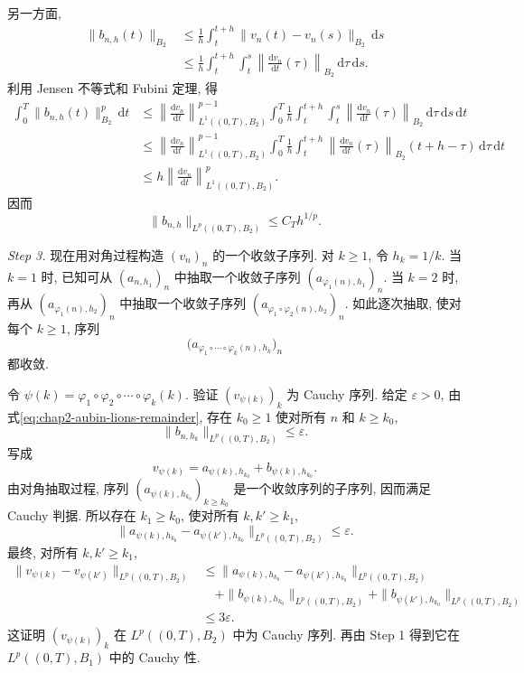 \begin{Proof}
另一方面,
\begin{align*}
 \|b_{n,h}(t)\|_{B_2}
 &\leq\frac1h\int_t^{t+h}\|v_n(t)-v_n(s)\|_{B_2}\,\mathrm{d}s\\
 &\leq\frac1h\int_t^{t+h}\int_t^s
 \left\|\frac{\mathrm{d}v_n}{\mathrm{d}t}(\tau)\right\|_{B_2}
 \,\mathrm{d}\tau\,\mathrm{d}s.
\end{align*}
利用 Jensen 不等式和 Fubini 定理, 得
\begin{align*}
 \int_0^T\|b_{n,h}(t)\|_{B_2}^p\,\mathrm{d}t
 &\leq
 \left\|\frac{\mathrm{d}v_n}{\mathrm{d}t}\right\|_{L^1((0,T),B_2)}^{p-1}
 \int_0^T\frac1h\int_t^{t+h}\int_t^s
 \left\|\frac{\mathrm{d}v_n}{\mathrm{d}t}(\tau)\right\|_{B_2}
 \,\mathrm{d}\tau\,\mathrm{d}s\,\mathrm{d}t\\
 &\leq
 \left\|\frac{\mathrm{d}v_n}{\mathrm{d}t}\right\|_{L^1((0,T),B_2)}^{p-1}
 \int_0^T\frac1h\int_t^{t+h}
 \left\|\frac{\mathrm{d}v_n}{\mathrm{d}t}(\tau)\right\|_{B_2}
 (t+h-\tau)\,\mathrm{d}\tau\,\mathrm{d}t\\
 &\leq h
 \left\|\frac{\mathrm{d}v_n}{\mathrm{d}t}\right\|_{L^1((0,T),B_2)}^p.
\end{align*}
因而
\begin{equation}
 \|b_{n,h}\|_{L^p((0,T),B_2)}\leq C_T h^{1/p}.
 \label{eq:chap2-aubin-lions-remainder}
\end{equation}

\emph{Step 3.} 现在用对角过程构造 $(v_n)_n$ 的一个收敛子序列. 对 $k\geq1$, 令 $h_k=1/k$. 当 $k=1$ 时, 已知可从 $(a_{n,h_1})_n$ 中抽取一个收敛子序列 $(a_{\varphi_1(n),h_1})_n$. 当 $k=2$ 时, 再从 $(a_{\varphi_1(n),h_2})_n$ 中抽取一个收敛子序列 $(a_{\varphi_1\circ\varphi_2(n),h_2})_n$. 如此逐次抽取, 使对每个 $k\geq1$, 序列
\[
 \bigl(a_{\varphi_1\circ\cdots\circ\varphi_k(n),h_k}\bigr)_n
\]
都收敛.

令 $\psi(k)=\varphi_1\circ\varphi_2\circ\cdots\circ\varphi_k(k)$. 验证 $(v_{\psi(k)})_k$ 为 Cauchy 序列. 给定 $\varepsilon>0$, 由式\eqref{eq:chap2-aubin-lions-remainder}, 存在 $k_0\geq1$ 使对所有 $n$ 和 $k\geq k_0$,
\[
 \|b_{n,h_k}\|_{L^p((0,T),B_2)}\leq\varepsilon.
\]
写成
\[
 v_{\psi(k)}=a_{\psi(k),h_{k_0}}+b_{\psi(k),h_{k_0}}.
\]
由对角抽取过程, 序列 $(a_{\psi(k),h_{k_0}})_{k\geq k_0}$ 是一个收敛序列的子序列, 因而满足 Cauchy 判据. 所以存在 $k_1\geq k_0$, 使对所有 $k,k'\geq k_1$,
\[
 \|a_{\psi(k),h_{k_0}}-a_{\psi(k'),h_{k_0}}\|_{L^p((0,T),B_2)}
 \leq\varepsilon.
\]
最终, 对所有 $k,k'\geq k_1$,
\begin{align*}
 \|v_{\psi(k)}-v_{\psi(k')}\|_{L^p((0,T),B_2)}
 &\leq
 \|a_{\psi(k),h_{k_0}}-a_{\psi(k'),h_{k_0}}\|_{L^p((0,T),B_2)}\\
 &\quad+\|b_{\psi(k),h_{k_0}}\|_{L^p((0,T),B_2)}
 +\|b_{\psi(k'),h_{k_0}}\|_{L^p((0,T),B_2)}\\
 &\leq3\varepsilon.
\end{align*}
这证明 $(v_{\psi(k)})_k$ 在 $L^p((0,T),B_2)$ 中为 Cauchy 序列. 再由 Step 1 得到它在 $L^p((0,T),B_1)$ 中的 Cauchy 性.
\end{Proof}

